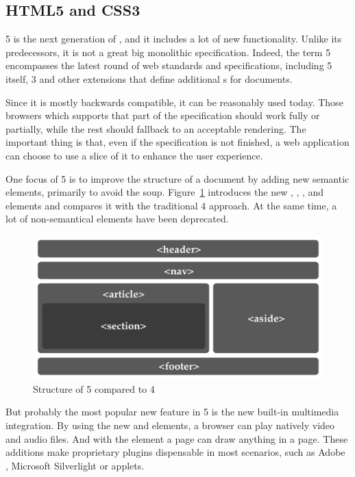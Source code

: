\subsection{HTML5 and CSS3} %
\label{sub:html5css3}

 5 is the next generation of , and it includes a lot of new functionality\cite{HTML5NEW}.
Unlike its predecessors, it is not a great big monolithic specification.
Indeed, the term  5 encompasses the latest round of web standards and specifications, including  5 itself,  3 and other extensions that define additional s for  documents.

Since it is mostly backwards compatible, it can be reasonably used today.
Those browsers which supports that part of the specification should work fully or partially, while the rest should fallback to an acceptable rendering.
The important thing is that, even if the specification is not finished, a web application can choose to use a slice of it to enhance the user experience.

One focus of  5 is to improve the structure of a document by adding new semantic elements, primarily to avoid the  soup.
Figure~\ref{fig:html5-structure} introduces the new , , ,  and  elements and compares it with the traditional  4 approach.
At the same time, a lot of non-semantical elements have been deprecated.

\begin{figure}[htbp]
  \centering
    \includegraphics[width=\textwidth]{figures/html5-structure}
  \caption{Structure of  5 compared to  4}
  \label{fig:html5-structure}
\end{figure}

But probably the most popular new feature in  5 is the new built-in multimedia integration.
By using the new  and  elements, a browser can play natively video and audio files.
And with the  element a page can draw anything in a page.
These additions make proprietary plugins dispensable in most scenarios, such as Adobe , Microsoft Silverlight or  applets.

